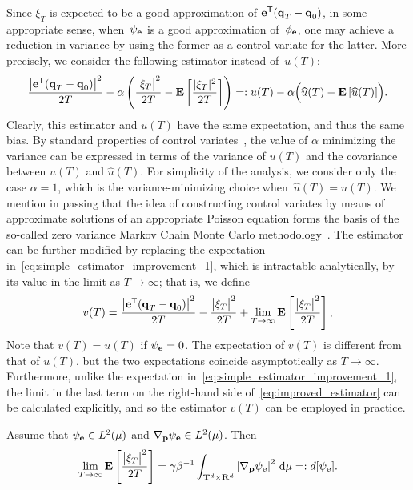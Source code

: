 \documentclass[11pt,a4paper]{article}
\begin{document}
Since $\xi_T$ is expected to be a good approximation of $\boldsymbol{\mathbf e}^\mathsf T(\boldsymbol{\mathbf q}_T - \boldsymbol{\mathbf q}_0)$,
in some appropriate sense,
when~$\psi_{\boldsymbol{\mathbf e}}$ is a good approximation of~$\phi_{\boldsymbol{\mathbf e}}$,
one may achieve a reduction in variance by using the former as a control variate for the latter.
More precisely, we consider the following estimator instead of~$u(T)$:
\begin{equation}
    \label{eq:simple_estimator_improvement_1}
     \frac{\bigl\lvert \boldsymbol{\mathbf e}^\mathsf T (\boldsymbol{\mathbf q}_T - \boldsymbol{\mathbf q}_0) \bigr\rvert^2}{2T}  -	\alpha  \left( \frac{\bigl\lvert \xi_T \bigr\rvert^2}{2T} - \mathbf{E} \left[ \frac{\lvert \xi_T \rvert^2}{2T} \right] \right)
    =: u(T) - \alpha \Bigl(\widehat u(T) - \mathbf{E} \left[\widehat u(T)\right]\Bigr).
\end{equation}
Clearly, this estimator and $u(T)$ have the same expectation, and thus the same bias.
By standard properties of control variates~\cite{kroese2013handbook},
the value of $\alpha$ minimizing the variance can be expressed in terms of the variance of $u(T)$ and
the covariance between $u(T)$ and $\widehat u(T)$.
For simplicity of the analysis,
we consider only the case $\alpha = 1$,
which is the variance-minimizing choice when~$\widehat u(T) = u(T)$.
We mention in passing that the idea of constructing control variates by means of approximate solutions of an appropriate Poisson equation forms the basis of the so-called zero variance Markov Chain Monte Carlo methodology~\cite{papamarkou_al_2014}.
The estimator can be further modified by replacing the expectation in~\eqref{eq:simple_estimator_improvement_1},
which is intractable analytically,
by its value in the limit as $T \to \infty$;
that is, we define
\begin{equation}
    \label{eq:improved_estimator}
    v(T) =  \frac{\bigl\lvert \boldsymbol{\mathbf e}^\mathsf T(\boldsymbol{\mathbf q}_T - \boldsymbol{\mathbf q}_0) \bigr\rvert^2}{2T} - \frac{\bigl\lvert \xi_T \bigr\rvert^2}{2T} + \lim_{T \to \infty} \mathbf{E} \left[\frac{\bigl\lvert \xi_T \bigr\rvert^2}{2T}\right],
\end{equation}
Note that $v(T) = u(T)$ if $\psi_{\boldsymbol{\mathbf e}} = 0$.
The expectation of $v(T)$ is different from that of $u(T)$,
but the two expectations coincide asymptotically as $T \to \infty$.
Furthermore, unlike the expectation in~\eqref{eq:simple_estimator_improvement_1},
the limit in the last term on the right-hand side of~\eqref{eq:improved_estimator} can be calculated explicitly,
and so the estimator $v(T)$ can be employed in practice.
\begin{lemma}
    \label{lemma:explicit_limit}
    Assume that $\psi_{\boldsymbol{\mathbf e}} \in L^2(\mu)$ and $\nabla_{\boldsymbol{\mathbf p}} \psi_{\boldsymbol{\mathbf e}} \in L^2(\mu)$.
    Then
    \begin{equation}
        \label{eq:explicit_limit}
        \lim_{T \to \infty} \expect \left[\frac{\bigl\lvert \xi_T \bigr\rvert^2}{2T}\right] = \gamma \beta^{-1} \int_{\torus^d \times \real^d} \abs{\grad_{\vect p} \psi_{\vect e}}^2 \, \d \mu =: d[\psi_{\vect e}].
    \end{equation}
\end{lemma}
\end{document}
